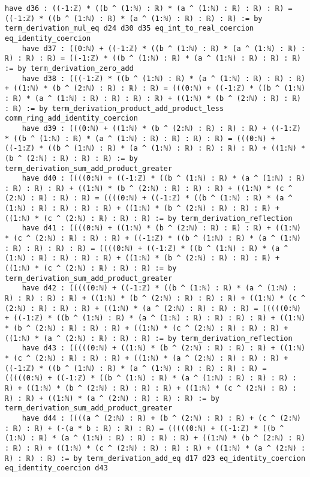 \documentclass{article}
\begin{document}
\begin{tcolorbox}[colback=white!10, width=\linewidth]
\begin{lstlisting}[language=Lean4]
    have d36 : ((-1:ℤ) * ((b ^ (1:ℕ) : ℝ) * (a ^ (1:ℕ) : ℝ) : ℝ) : ℝ) = ((-1:ℤ) * ((b ^ (1:ℕ) : ℝ) * (a ^ (1:ℕ) : ℝ) : ℝ) : ℝ) := by term_derivation_mul_eq d24 d30 d35 eq_int_to_real_coercion eq_identity_coercion
    have d37 : ((0:ℕ) + ((-1:ℤ) * ((b ^ (1:ℕ) : ℝ) * (a ^ (1:ℕ) : ℝ) : ℝ) : ℝ) : ℝ) = ((-1:ℤ) * ((b ^ (1:ℕ) : ℝ) * (a ^ (1:ℕ) : ℝ) : ℝ) : ℝ) := by term_derivation_zero_add
    have d38 : (((-1:ℤ) * ((b ^ (1:ℕ) : ℝ) * (a ^ (1:ℕ) : ℝ) : ℝ) : ℝ) + ((1:ℕ) * (b ^ (2:ℕ) : ℝ) : ℝ) : ℝ) = (((0:ℕ) + ((-1:ℤ) * ((b ^ (1:ℕ) : ℝ) * (a ^ (1:ℕ) : ℝ) : ℝ) : ℝ) : ℝ) + ((1:ℕ) * (b ^ (2:ℕ) : ℝ) : ℝ) : ℝ) := by term_derivation_product_add_product_less comm_ring_add_identity_coercion
    have d39 : (((0:ℕ) + ((1:ℕ) * (b ^ (2:ℕ) : ℝ) : ℝ) : ℝ) + ((-1:ℤ) * ((b ^ (1:ℕ) : ℝ) * (a ^ (1:ℕ) : ℝ) : ℝ) : ℝ) : ℝ) = (((0:ℕ) + ((-1:ℤ) * ((b ^ (1:ℕ) : ℝ) * (a ^ (1:ℕ) : ℝ) : ℝ) : ℝ) : ℝ) + ((1:ℕ) * (b ^ (2:ℕ) : ℝ) : ℝ) : ℝ) := by term_derivation_sum_add_product_greater
    have d40 : ((((0:ℕ) + ((-1:ℤ) * ((b ^ (1:ℕ) : ℝ) * (a ^ (1:ℕ) : ℝ) : ℝ) : ℝ) : ℝ) + ((1:ℕ) * (b ^ (2:ℕ) : ℝ) : ℝ) : ℝ) + ((1:ℕ) * (c ^ (2:ℕ) : ℝ) : ℝ) : ℝ) = ((((0:ℕ) + ((-1:ℤ) * ((b ^ (1:ℕ) : ℝ) * (a ^ (1:ℕ) : ℝ) : ℝ) : ℝ) : ℝ) + ((1:ℕ) * (b ^ (2:ℕ) : ℝ) : ℝ) : ℝ) + ((1:ℕ) * (c ^ (2:ℕ) : ℝ) : ℝ) : ℝ) := by term_derivation_reflection
    have d41 : ((((0:ℕ) + ((1:ℕ) * (b ^ (2:ℕ) : ℝ) : ℝ) : ℝ) + ((1:ℕ) * (c ^ (2:ℕ) : ℝ) : ℝ) : ℝ) + ((-1:ℤ) * ((b ^ (1:ℕ) : ℝ) * (a ^ (1:ℕ) : ℝ) : ℝ) : ℝ) : ℝ) = ((((0:ℕ) + ((-1:ℤ) * ((b ^ (1:ℕ) : ℝ) * (a ^ (1:ℕ) : ℝ) : ℝ) : ℝ) : ℝ) + ((1:ℕ) * (b ^ (2:ℕ) : ℝ) : ℝ) : ℝ) + ((1:ℕ) * (c ^ (2:ℕ) : ℝ) : ℝ) : ℝ) := by term_derivation_sum_add_product_greater
    have d42 : (((((0:ℕ) + ((-1:ℤ) * ((b ^ (1:ℕ) : ℝ) * (a ^ (1:ℕ) : ℝ) : ℝ) : ℝ) : ℝ) + ((1:ℕ) * (b ^ (2:ℕ) : ℝ) : ℝ) : ℝ) + ((1:ℕ) * (c ^ (2:ℕ) : ℝ) : ℝ) : ℝ) + ((1:ℕ) * (a ^ (2:ℕ) : ℝ) : ℝ) : ℝ) = (((((0:ℕ) + ((-1:ℤ) * ((b ^ (1:ℕ) : ℝ) * (a ^ (1:ℕ) : ℝ) : ℝ) : ℝ) : ℝ) + ((1:ℕ) * (b ^ (2:ℕ) : ℝ) : ℝ) : ℝ) + ((1:ℕ) * (c ^ (2:ℕ) : ℝ) : ℝ) : ℝ) + ((1:ℕ) * (a ^ (2:ℕ) : ℝ) : ℝ) : ℝ) := by term_derivation_reflection
    have d43 : (((((0:ℕ) + ((1:ℕ) * (b ^ (2:ℕ) : ℝ) : ℝ) : ℝ) + ((1:ℕ) * (c ^ (2:ℕ) : ℝ) : ℝ) : ℝ) + ((1:ℕ) * (a ^ (2:ℕ) : ℝ) : ℝ) : ℝ) + ((-1:ℤ) * ((b ^ (1:ℕ) : ℝ) * (a ^ (1:ℕ) : ℝ) : ℝ) : ℝ) : ℝ) = (((((0:ℕ) + ((-1:ℤ) * ((b ^ (1:ℕ) : ℝ) * (a ^ (1:ℕ) : ℝ) : ℝ) : ℝ) : ℝ) + ((1:ℕ) * (b ^ (2:ℕ) : ℝ) : ℝ) : ℝ) + ((1:ℕ) * (c ^ (2:ℕ) : ℝ) : ℝ) : ℝ) + ((1:ℕ) * (a ^ (2:ℕ) : ℝ) : ℝ) : ℝ) := by term_derivation_sum_add_product_greater
    have d44 : ((((a ^ (2:ℕ) : ℝ) + (b ^ (2:ℕ) : ℝ) : ℝ) + (c ^ (2:ℕ) : ℝ) : ℝ) + (-(a * b : ℝ) : ℝ) : ℝ) = (((((0:ℕ) + ((-1:ℤ) * ((b ^ (1:ℕ) : ℝ) * (a ^ (1:ℕ) : ℝ) : ℝ) : ℝ) : ℝ) + ((1:ℕ) * (b ^ (2:ℕ) : ℝ) : ℝ) : ℝ) + ((1:ℕ) * (c ^ (2:ℕ) : ℝ) : ℝ) : ℝ) + ((1:ℕ) * (a ^ (2:ℕ) : ℝ) : ℝ) : ℝ) := by term_derivation_add_eq d17 d23 eq_identity_coercion eq_identity_coercion d43

\end{lstlisting}
\end{tcolorbox}
\end{document}
